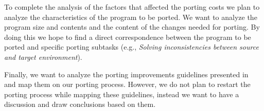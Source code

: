 To complete the analysis of the factors that affected the porting costs we plan
to analyze the characteristics of the program to be ported. We want to analyze
the program size and contents and the content of the changes needed for porting.
By doing this we hope to find a direct correspondence between the program to be
ported and specific porting subtasks (e.g., \textit{Solving inconsistencies
between source and target environment}).

Finally, we want to analyze the porting improvements guidelines presented
in~\cite{hakuta} and map them on our porting process. However, we do not plan to
restart the porting process while mapping these guidelines, instead we want to
have a discussion and draw conclusions based on them.
